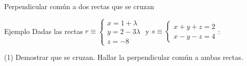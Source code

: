 \documentclass[8pt]{beamer}
\begin{document}
\begin{frame}{Perpendicular común a dos rectas que se cruzan}
\begin{exampleblock}{Ejemplo}
Dadas las rectas $r \equiv \begin{cases} x=1+\lambda \\ y=2-3\lambda \\ z=-8 \end{cases}$ y $s  \equiv \begin{cases} x+y+z=2 \\ x-y-z = 4 \end{cases}$:
\begin{tasks}[label=\alph*)](1)
\task Demostrar que se cruzan.
\task Hallar la perpendicular común a ambas rectas.
\end{tasks}
\end{exampleblock}
\end{frame}
\end{document}
